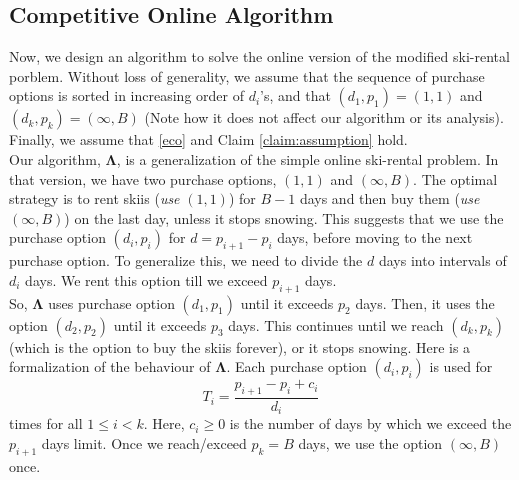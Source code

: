 \documentclass[11pt]{article}
\begin{document}
\subsection*{Competitive Online Algorithm}
Now, we design an algorithm to solve the online version of the modified ski-rental porblem. Without loss of generality,
we assume that the sequence of purchase options is sorted in increasing order of $d_{i}$'s, and that $(d_{1}, p_{1}) = (1, 1)$
and $(d_{k}, p_{k}) = (\infty, B)$ (Note how it does not affect our algorithm or its analysis). Finally, we assume that
\eqref{eco} and Claim \ref{claim:assumption} hold. \\
Our algorithm, $\mathbf{\Lambda}$, is a generalization of the simple online ski-rental problem. In that version, we have
two purchase options, $(1, 1)$ and $(\infty, B)$. The optimal strategy is to rent skiis (\textit{use} $(1, 1)$) for $B-1$ days and then
buy them (\textit{use} $(\infty, B)$) on the last day, unless it stops snowing. This suggests that we use the purchase option
$(d_{i}, p_{i})$ for $d = p_{i+1} - p_{i}$ days, before moving to the next purchase option. To generalize this, we need to divide the
$d$ days into intervals of $d_{i}$ days. We rent this option till we exceed $p_{i+1}$ days. \\
So, $\mathbf{\Lambda}$ uses purchase option $(d_{1}, p_{1})$ until it exceeds $p_{2}$ days. Then, it uses the option $(d_{2}, p_{2})$
until it exceeds $p_{3}$ days. This continues until we reach $(d_{k}, p_{k})$ (which is the option to buy the skiis forever), or it stops
snowing. Here is a formalization of the behaviour of $\mathbf{\Lambda}$. Each purchase option $(d_{i}, p_{i})$ is used for
\begin{equation}
    \label{times-used}
    T_{i} = \frac{p_{i+1} - p_{i} + c_{i}}{d_{i}}
\end{equation}
times for all $1 \leq i < k$. Here, $c_{i} \geq 0$ is the number of days by which we exceed the $p_{i+1}$ days limit. Once we
reach/exceed $p_{k} = B$ days, we use the option $(\infty, B)$ once.
\end{document}

